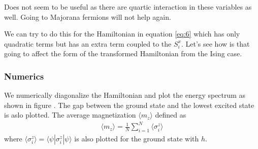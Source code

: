 \documentclass[a4paper]{extarticle}
\begin{document}
Does not seem to be useful as there are quartic interaction in these variables as well. Going to Majorana fermions will not help again.

We can try to do this for the Hamiltonian in equation \ref{eq:6} which has only quadratic terms but has an extra term coupled to the $S_i^x$. Let's see how is that going to affect the form of the transformed Hamiltonian from the Ising case.



\clearpage

\subsubsection{Numerics}
We numerically diagonalize the Hamiltonian and plot the energy spectrum as shown in figure . The gap between the ground state and the lowest excited state is aslo plotted. The average magnetization $\langle m_z \rangle$ defined as 
\begin{eqnarray} \label{eq:3}
\langle m_z \rangle = \frac{1}{N} \sum_{i=1}^{N} \langle \sigma_i^z \rangle 
\end{eqnarray}
where $\langle \sigma_i^z \rangle = \langle \psi | \sigma_i^z | \psi \rangle$ is also plotted for the ground state with $h$.

\end{document}
